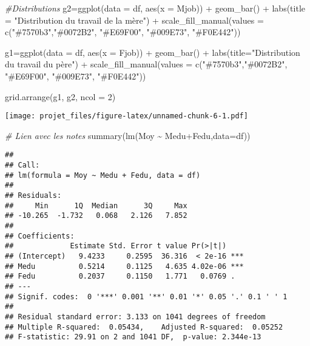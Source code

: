 \documentclass[
]{article}
\newenvironment{Shaded}{\begin{snugshade}}{\end{snugshade}}
\newcommand{\AttributeTok}[1]{\textcolor[rgb]{0.77,0.63,0.00}{#1}}
\newcommand{\CommentTok}[1]{\textcolor[rgb]{0.56,0.35,0.01}{\textit{#1}}}
\newcommand{\DecValTok}[1]{\textcolor[rgb]{0.00,0.00,0.81}{#1}}
\newcommand{\FunctionTok}[1]{\textcolor[rgb]{0.00,0.00,0.00}{#1}}
\newcommand{\NormalTok}[1]{#1}
\newcommand{\OtherTok}[1]{\textcolor[rgb]{0.56,0.35,0.01}{#1}}
\newcommand{\SpecialCharTok}[1]{\textcolor[rgb]{0.00,0.00,0.00}{#1}}
\newcommand{\StringTok}[1]{\textcolor[rgb]{0.31,0.60,0.02}{#1}}
\begin{document}
\begin{Shaded}
\begin{Highlighting}[]
\CommentTok{\#Distributions}
\NormalTok{g2}\OtherTok{=}\FunctionTok{ggplot}\NormalTok{(}\AttributeTok{data =}\NormalTok{ df, }\FunctionTok{aes}\NormalTok{(}\AttributeTok{x =}\NormalTok{ Mjob)) }\SpecialCharTok{+}
  \FunctionTok{geom\_bar}\NormalTok{() }\SpecialCharTok{+}
  \FunctionTok{labs}\NormalTok{(}\AttributeTok{title =} \StringTok{"Distribution du travail de la mère"}\NormalTok{) }\SpecialCharTok{+}
  \FunctionTok{scale\_fill\_manual}\NormalTok{(}\AttributeTok{values =} \FunctionTok{c}\NormalTok{(}\StringTok{"\#7570b3"}\NormalTok{,}\StringTok{"\#0072B2"}\NormalTok{, }\StringTok{"\#E69F00"}\NormalTok{, }\StringTok{"\#009E73"}\NormalTok{, }\StringTok{"\#F0E442"}\NormalTok{))}

\NormalTok{g1}\OtherTok{=}\FunctionTok{ggplot}\NormalTok{(}\AttributeTok{data =}\NormalTok{ df, }\FunctionTok{aes}\NormalTok{(}\AttributeTok{x =}\NormalTok{ Fjob)) }\SpecialCharTok{+}
  \FunctionTok{geom\_bar}\NormalTok{() }\SpecialCharTok{+}
  \FunctionTok{labs}\NormalTok{(}\AttributeTok{title=}\StringTok{"Distribution du travail du père"}\NormalTok{) }\SpecialCharTok{+}
  \FunctionTok{scale\_fill\_manual}\NormalTok{(}\AttributeTok{values =} \FunctionTok{c}\NormalTok{(}\StringTok{"\#7570b3"}\NormalTok{,}\StringTok{"\#0072B2"}\NormalTok{, }\StringTok{"\#E69F00"}\NormalTok{, }\StringTok{"\#009E73"}\NormalTok{, }\StringTok{"\#F0E442"}\NormalTok{))}

\FunctionTok{grid.arrange}\NormalTok{(g1, g2, }\AttributeTok{ncol =} \DecValTok{2}\NormalTok{)}
\end{Highlighting}
\end{Shaded}

\texttt{[image: projet\_files/figure-latex/unnamed-chunk-6-1.pdf]}

\begin{Shaded}
\begin{Highlighting}[]
\CommentTok{\# Lien avec les notes}
\FunctionTok{summary}\NormalTok{(}\FunctionTok{lm}\NormalTok{(Moy }\SpecialCharTok{\textasciitilde{}}\NormalTok{ Medu}\SpecialCharTok{+}\NormalTok{Fedu,}\AttributeTok{data=}\NormalTok{df))}
\end{Highlighting}
\end{Shaded}

\begin{verbatim}
## 
## Call:
## lm(formula = Moy ~ Medu + Fedu, data = df)
## 
## Residuals:
##     Min      1Q  Median      3Q     Max 
## -10.265  -1.732   0.068   2.126   7.852 
## 
## Coefficients:
##             Estimate Std. Error t value Pr(>|t|)    
## (Intercept)   9.4233     0.2595  36.316  < 2e-16 ***
## Medu          0.5214     0.1125   4.635 4.02e-06 ***
## Fedu          0.2037     0.1150   1.771   0.0769 .  
## ---
## Signif. codes:  0 '***' 0.001 '**' 0.01 '*' 0.05 '.' 0.1 ' ' 1
## 
## Residual standard error: 3.133 on 1041 degrees of freedom
## Multiple R-squared:  0.05434,    Adjusted R-squared:  0.05252 
## F-statistic: 29.91 on 2 and 1041 DF,  p-value: 2.344e-13
\end{verbatim}
\end{document}
